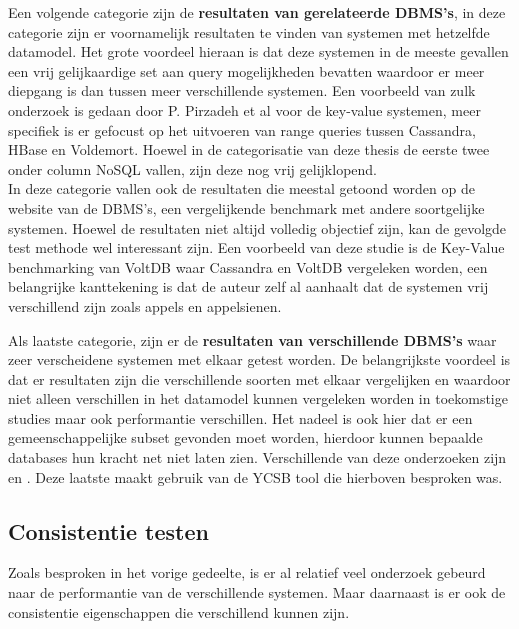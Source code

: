 Een volgende categorie zijn de \textbf{resultaten van gerelateerde DBMS's}, in deze categorie zijn er voornamelijk resultaten te vinden van systemen met hetzelfde datamodel. Het grote voordeel hieraan is dat deze systemen in de meeste gevallen een vrij gelijkaardige set aan query mogelijkheden bevatten waardoor er meer diepgang is dan tussen meer verschillende systemen. Een voorbeeld van zulk onderzoek is gedaan door P. Pirzadeh et al\cite{pirzadeh2011performance} voor de key-value systemen, meer specifiek is er gefocust op het uitvoeren van range queries tussen Cassandra, HBase en Voldemort. Hoewel in de categorisatie van deze thesis de eerste twee onder column NoSQL vallen, zijn deze nog vrij gelijklopend. \\
In deze categorie vallen ook de resultaten die meestal getoond worden op de website van de DBMS's, een vergelijkende benchmark met andere soortgelijke systemen. Hoewel de resultaten niet altijd volledig objectief zijn, kan de gevolgde test methode wel interessant zijn. Een voorbeeld van deze studie is de Key-Value benchmarking van VoltDB\cite{huggkey} waar Cassandra en VoltDB vergeleken worden, een belangrijke kanttekening is dat de auteur zelf al aanhaalt dat de systemen vrij verschillend zijn zoals appels en appelsienen.  

Als laatste categorie, zijn er de \textbf{resultaten van verschillende DBMS's} waar zeer verscheidene systemen met elkaar getest worden. De belangrijkste voordeel is dat er resultaten zijn die verschillende soorten met elkaar vergelijken en waardoor niet alleen verschillen in het datamodel kunnen vergeleken worden in toekomstige studies maar ook performantie verschillen. Het nadeel is ook hier dat er een gemeenschappelijke subset gevonden moet worden, hierdoor kunnen bepaalde databases hun kracht net niet laten zien. Verschillende van deze onderzoeken zijn \cite{tudorica2011comparison} en \cite{rabl2012solving}. Deze laatste maakt gebruik van de YCSB tool die hierboven besproken was. 


\subsection{Consistentie testen}
Zoals besproken in het vorige gedeelte, is er al relatief veel onderzoek gebeurd naar de performantie van de verschillende systemen. Maar daarnaast is er ook de consistentie eigenschappen die verschillend kunnen zijn. 

